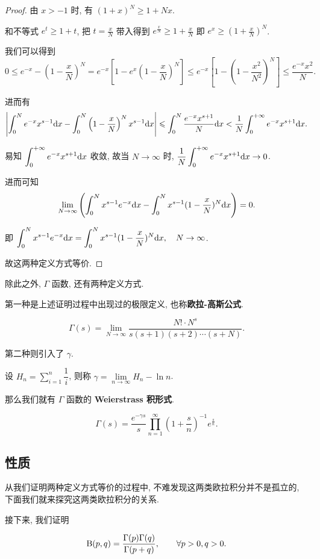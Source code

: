 \begin{proof}
	由 $x>-1$ 时, 有 $(1+x)^N\geqslant 1+Nx$.

	和不等式 $e^t \geqslant 1+t$, 把 $t=\frac x N$ 带入得到 $e^{\frac x N} \geqslant 1+\frac x N$ 即 $e^x \geqslant (1+\frac x N)^N$.

	我们可以得到 $$0 \leqslant e^{-x}-(1-\frac x N)^N=e^{-x}\left[1-e^x(1-\frac x N)^N\right]\leqslant e^{-x}\left[1-(1-\frac {x^2} {N^2})^N\right] \leqslant \frac{e^{-x}x^2}{N}.$$

	进而有 $$\left|\int_0^N e^{-x}x^{s-1}\text {d} x-\int_0^N\left(1-\frac x N\right)^N x^{s-1}\text {d} x \right|\leqslant\int_0^N \frac{e^{-x}x^{s+1}}{N}\text {d} x <\frac 1 N\int_0^{+\infty}e^{-x}x^{s+1}\text {d} x.$$

	易知 $\displaystyle \int_0^{+\infty}e^{-x}x^{s+1}\text {d} x$ 收敛, 故当 $N\to \infty$ 时, $\displaystyle\frac 1 N\int_0^{+\infty}e^{-x}x^{s+1}\text {d} x \to 0$.

	进而可知 $$\lim\limits_{N\to \infty}\left(\int_0^N x^{s-1}e^{-x} \text {d} x - \int_0^N x^{s-1}(1-\frac x N)^N \text {d} x\right)=0.$$

	即 $\displaystyle \int_0^N x^{s-1}e^{-x} \text {d} x = \int_0^N x^{s-1}(1-\frac x N)^N \text {d} x, \quad N\to \infty$.

	故这两种定义方式等价.
\end{proof}

除此之外, $\Gamma$ 函数, 还有两种定义方式.

第一种是上述证明过程中出现过的极限定义, 也称\textbf{欧拉-高斯公式}.

$$\Gamma(s)=\lim\limits_{N\to\infty}\dfrac{N!\cdot N^s}{s(s+1)(s+2)\cdots(s+N)}.$$

第二种则引入了 $\gamma$.

设 $H_n=\sum\limits_{i=1}^n \dfrac{1}{i}$, 则称 $\gamma=\lim\limits_{n\to \infty}H_n-\ln n$.

那么我们就有 $\Gamma$ 函数的 \textbf{Weierstrass 积形式}.

$$\Gamma(s)=\dfrac{e^{-\gamma s}}{s}\prod\limits_{n=1}^\infty \left(1+\dfrac s n\right)^{-1}e^{\frac s n}.$$
\subsection{性质}

从我们证明两种定义方式等价的过程中, 不难发现这两类欧拉积分并不是孤立的, 下面我们就来探究这两类欧拉积分的关系.

接下来, 我们证明
\begin{property}

	$$\text {B}(p,q)=\dfrac{\Gamma(p)\Gamma(q)}{\Gamma(p+q)},\qquad \forall p>0,q>0.$$
\end{property}

